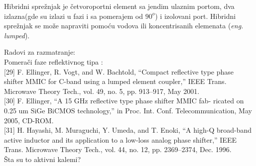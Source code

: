 \documentclass[journal,twocolumn,letterpaper]{IEEEJERM}
\begin{document}
Hibridni sprežnjak je četvoroportni element sa jendim ulaznim portom, dva izlazna(gde su izlazi u fazi i sa pomerajem od $90^o$) i izolovani port. Hibridni sprežnjak se može napraviti pomoću vodova ili koncentrisanih elemenata (\textit{eng. lumped}). 



Radovi za razmatranje: \\

Pomerači faze reflektivnog tipa : \\

[29] F. Ellinger, R. Vogt, and W. Bachtold, “Compact reflective type phase
shifter MMIC for C-band using a lumped element coupler,” IEEE
Trans. Microwave Theory Tech., vol. 49, no. 5, pp. 913–917, May 2001. \\

[30] F. Ellinger, “A 15 GHz reflective type phase shifter MMIC fab-
ricated on 0.25 um SiGe BiCMOS technology,” in Proc. Int. Conf.
Telecommunication, May 2005, CD-ROM. \\

[31] H. Hayashi, M. Muraguchi, Y. Umeda, and T. Enoki, “A high-Q
broad-band active inductor and its application to a low-loss analog
phase shifter,” IEEE Trans. Microwave Theory Tech., vol. 44, no. 12,
pp. 2369–2374, Dec. 1996. \\


Šta su to aktivni kalemi? \\











% 
\end{document}
